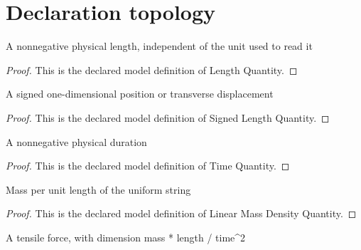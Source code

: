 \section{Declaration topology}
\begin{definition}
  \label{def:physics:phyx-mini-0291:phyxminiproblems-problemphyxmini0291-lengthquantity}
  A nonnegative physical length, independent of the unit used to read it
\end{definition}
\begin{proof}
  This is the declared model definition of Length Quantity.
\end{proof}
\begin{definition}
  \label{def:physics:phyx-mini-0291:phyxminiproblems-problemphyxmini0291-signedlengthquantity}
  A signed one-dimensional position or transverse displacement
\end{definition}
\begin{proof}
  This is the declared model definition of Signed Length Quantity.
\end{proof}
\begin{definition}
  \label{def:physics:phyx-mini-0291:phyxminiproblems-problemphyxmini0291-timequantity}
  A nonnegative physical duration
\end{definition}
\begin{proof}
  This is the declared model definition of Time Quantity.
\end{proof}
\begin{definition}
  \label{def:physics:phyx-mini-0291:phyxminiproblems-problemphyxmini0291-linearmassdensityquantity}
  Mass per unit length of the uniform string
\end{definition}
\begin{proof}
  This is the declared model definition of Linear Mass Density Quantity.
\end{proof}
\begin{definition}
  \label{def:physics:phyx-mini-0291:phyxminiproblems-problemphyxmini0291-tensionquantity}
  A tensile force, with dimension mass * length / time\textasciicircum{}2
\end{definition}
